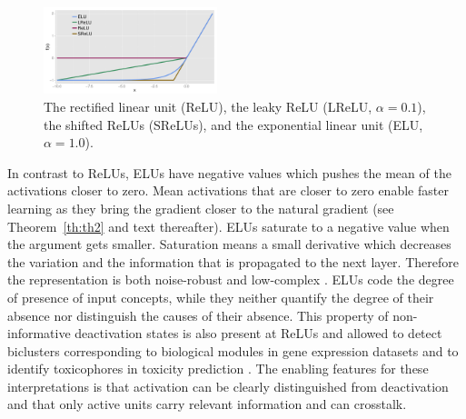 \documentclass{article}
\begin{document}
\begin{figure}
\vspace*{-10pt}
\begin{center}
\includegraphics[width=0.45\textwidth]{ActivationFunction}
\end{center}
\caption{The rectified linear unit (ReLU), the leaky ReLU (LReLU, $\alpha=0.1$), the shifted ReLUs (SReLUs),
and the exponential linear unit (ELU, $\alpha=1.0$). \label{fig:ActivationFunction}}
\vspace*{-5pt}
\end{figure}
In contrast to ReLUs, ELUs have negative values which
pushes the mean of the activations closer to zero.
Mean activations that are closer to zero enable faster learning as
they bring the gradient closer to the natural gradient (see
Theorem~\ref{th:th2} and text thereafter).
ELUs saturate to a negative value when the argument gets smaller.
Saturation means a small derivative
which decreases the variation and the information that is
propagated to the next layer. Therefore the representation
is both noise-robust and low-complex \citep{Hochreiter:99nc}.
ELUs code the degree of presence of input concepts,
while they neither quantify the degree of their absence nor distinguish
the causes of their absence.
This property of non-informative deactivation states is also present at ReLUs
and allowed to detect biclusters corresponding to
biological modules in gene expression datasets \citep{Clevert:15nips} and
to identify toxicophores in toxicity prediction \citep{Unterthiner:15,Mayr:15}.
The enabling features for these interpretations
is that activation can be clearly distinguished from deactivation
and that only active units carry relevant information and can crosstalk.
\end{document}
